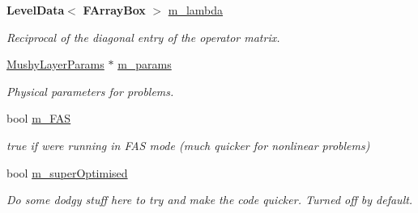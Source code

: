 \begin{DoxyCompactItemize}
\mbox{\label{class_a_m_r_non_linear_multi_comp_op_afc96721bca344bb2d470d7f0731b4285}} 
\textbf{ Level\+Data}$<$ \textbf{ F\+Array\+Box} $>$ \hyperlink{class_a_m_r_non_linear_multi_comp_op_afc96721bca344bb2d470d7f0731b4285}{m\+\_\+lambda}
\begin{DoxyCompactList}\small\item\em Reciprocal of the diagonal entry of the operator matrix. \end{DoxyCompactList}\item 
\mbox{\label{class_a_m_r_non_linear_multi_comp_op_aafb3edc6ac424eb1e6f7bbc9a15c1c9e}} 
\hyperlink{class_mushy_layer_params}{Mushy\+Layer\+Params} $\ast$ \hyperlink{class_a_m_r_non_linear_multi_comp_op_aafb3edc6ac424eb1e6f7bbc9a15c1c9e}{m\+\_\+params}
\begin{DoxyCompactList}\small\item\em Physical parameters for problems. \end{DoxyCompactList}\item 
\mbox{\label{class_a_m_r_non_linear_multi_comp_op_a56ee2a89dc1bce9701951d48633fc808}} 
bool \hyperlink{class_a_m_r_non_linear_multi_comp_op_a56ee2a89dc1bce9701951d48633fc808}{m\+\_\+\+F\+AS}
\begin{DoxyCompactList}\small\item\em true if we\textquotesingle{}re running in F\+AS mode (much quicker for nonlinear problems) \end{DoxyCompactList}\item 
\mbox{\label{class_a_m_r_non_linear_multi_comp_op_ac6eaaca1f19c03eb6cd3f08c0b310143}} 
bool \hyperlink{class_a_m_r_non_linear_multi_comp_op_ac6eaaca1f19c03eb6cd3f08c0b310143}{m\+\_\+super\+Optimised}
\begin{DoxyCompactList}\small\item\em Do some dodgy stuff here to try and make the code quicker. Turned off by default. \end{DoxyCompactList}\end{DoxyCompactItemize}
